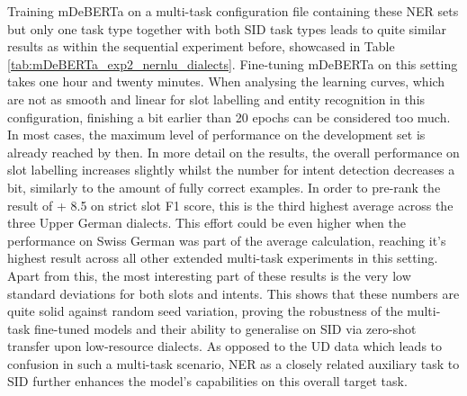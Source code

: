 \documentclass[11pt,a4paper,twoside,openright]{scrbook}
\begin{document}
Training mDeBERTa on a multi-task configuration file containing these NER sets but only one task type together with both SID task types leads to quite similar results as within the sequential experiment before, showcased in Table \ref{tab:mDeBERTa_exp2_nernlu_dialects}. Fine-tuning mDeBERTa on this setting takes one hour and twenty minutes. When analysing the learning curves, which are not as smooth and linear for slot labelling and entity recognition in this configuration, finishing a bit earlier than 20 epochs can be considered too much. In most cases, the maximum level of performance on the development set is already reached by then. In more detail on the results, the overall performance on slot labelling increases slightly whilst the number for intent detection decreases a bit, similarly to the amount of fully correct examples. In order to pre-rank the result of + 8.5 on strict slot F1 score, this is the third highest average across the three Upper German dialects. This effort could be even higher when the performance on Swiss German was part of the average calculation, reaching it's highest result across all other extended multi-task experiments in this setting. Apart from this, the most interesting part of these results is the very low standard deviations for both slots and intents. This shows that these numbers are quite solid against random seed variation, proving the robustness of the multi-task fine-tuned models and their ability to generalise on SID via zero-shot transfer upon low-resource dialects. As opposed to the UD data which leads to confusion in such a multi-task scenario, NER as a closely related auxiliary task to SID further enhances the model's capabilities on this overall target task.

\begin{table}[!ht]
\caption{Results for the basic multi-task NERxNLU experiment with mDeBERTa according to Upper German dialects over three random seeds, Avg. = average on languages without English, German and Swiss German, Diff. = average performance difference to mDeBERTa baseline, sd = standard deviation}
\label{tab:mDeBERTa_exp2_nernlu_dialects}
\end{table}
\end{document}
